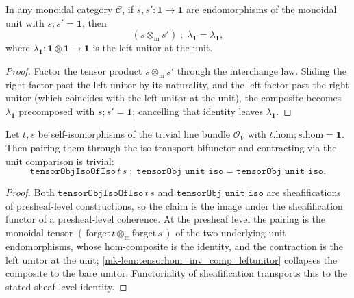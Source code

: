 \begin{lemma}\label{mk-lem:tensorhom_inv_comp_leftunitor}
  \leanok

  In any monoidal category \(\mathcal C\), if \(s, s' : \mathbf 1 \to \mathbf 1\) are endomorphisms
  of the monoidal unit with \(s \mathbin{;} s' = \mathbf 1\), then
  \[
    (s \otimes_{\mathrm m} s') \;\mathbin{;}\; \lambda_{\mathbf 1} = \lambda_{\mathbf 1},
  \]
  where \(\lambda_{\mathbf 1} : \mathbf 1 \otimes \mathbf 1 \to \mathbf 1\) is the left unitor at the
  unit.
\end{lemma}
\begin{proof}
  \leanok

Factor the tensor product \(s \otimes_{\mathrm m} s'\) through the interchange law. Sliding the
  right factor past the left unitor by its naturality, and the left factor past the right unitor
  (which coincides with the left unitor at the unit), the composite becomes \(\lambda_{\mathbf 1}\)
  precomposed with \(s \mathbin{;} s' = \mathbf 1\); cancelling that identity leaves
  \(\lambda_{\mathbf 1}\).
\end{proof}

\begin{lemma}\label{mk-lem:tensorobjisoofiso_comp_unit_iso}
  \leanok

  Let \(t, s\) be self-isomorphisms of the trivial line bundle \(\mathcal O_V\) with
  \(t.\mathrm{hom} \mathbin{;} s.\mathrm{hom} = \mathbf 1\). Then pairing them through the
  iso-transport bifunctor and contracting via the unit comparison is trivial:
  \[
    \mathtt{tensorObjIsoOfIso}\,t\,s \;\mathbin{;}\; \mathtt{tensorObj\_unit\_iso}
      = \mathtt{tensorObj\_unit\_iso}.
  \]
\end{lemma}
\begin{proof}
  \leanok
  Both \(\mathtt{tensorObjIsoOfIso}\,t\,s\) and \(\mathtt{tensorObj\_unit\_iso}\) are sheafifications
  of presheaf-level constructions, so the claim is the image under the sheafification functor of a
  presheaf-level coherence. At the presheaf level the pairing is the monoidal tensor
  \((\,\mathrm{forget}\,t \otimes_{\mathrm m} \mathrm{forget}\,s\,)\) of the two underlying unit
  endomorphisms, whose hom-composite is the identity, and the contraction is the left unitor at the
  unit; \ref{mk-lem:tensorhom_inv_comp_leftunitor} collapses the composite to the bare unitor.
  Functoriality of sheafification transports this to the stated sheaf-level identity.
\end{proof}

